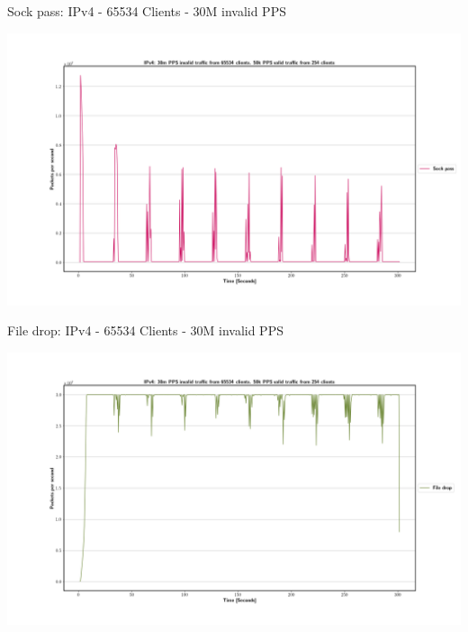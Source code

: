 \documentclass[11pt,english,table,dvipsnames]{beamer}
\begin{document}
\begin{frame}{Sock pass: IPv4 - 65534 Clients - 30M invalid PPS}
    \begin{center}
        \includegraphics[width=1.\linewidth]{images/IPv4_30m_65534_1_sock_pass.png}
    \end{center}
\end{frame}

\begin{frame}{File drop: IPv4 - 65534 Clients - 30M invalid PPS}
    \begin{center}
        \includegraphics[width=1.\linewidth]{images/IPv4_30m_65534_1_file_drop.png}
    \end{center}
\end{frame}
\end{document}
